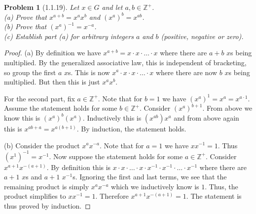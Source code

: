 \documentclass{article}
\newtheorem{problem}{Problem}
\begin{document}
\begin{problem}[1.1.19]
\label{powers}
Let $x \in G$ and let $a, b \in \mathbb{Z}^+$.\\
(a) Prove that $x^{a+b} = x^ax^b$ and $(x^a)^b = x^{ab}$.\\
(b) Prove that $(x^a)^{-1} = x^{-a}$.\\
(c) Establish part (a) for arbitrary integers $a$ and $b$ (positive, negative or zero).
\end{problem}
\begin{proof}
(a) By definition we have $x^{a+b} = x \cdot x \cdot \dots \cdot x$ where there are $a + b$ $x$s being multiplied. By the generalized associative law, this is independent of bracketing, so group the first $a$ $x$s. This is now $x^a \cdot x \cdot x \cdot \dots \cdot x$ where there are now $b$ $x$s being multiplied. But then this is just $x^ax^b$.

For the second part, fix $a \in \mathbb{Z}^+$. Note that for $b = 1$ we have $(x^a)^1 = x^a = x^{a \cdot 1}$. Assume the statement holds for some $b \in \mathbb{Z}^+$. Consider $(x^a)^{b+1}$. From above we know this is $(x^a)^b(x^a)$. Inductively this is $(x^{ab})x^a$ and from above again this is $x^{ab+a} = x^{a(b+1)}$. By induction, the statement holds.

(b) Consider the product $x^a x^{-a}$. Note that for $a = 1$ we have $xx^{-1} = 1$. Thus $(x^1)^{-1} = x^{-1}$. Now suppose the statement holds for some $a \in \mathbb{Z}^+$. Consider $x^{a+1}x^{-(a+1)}$. By definition this is $x \cdot x \cdot \dots \cdot x \cdot x^{-1} \cdot x^{-1} \cdot \dots \cdot x^{-1}$ where there are $a+1$ $x$s and $a+1$ $x^{-1}$s. Ignoring the first and last terms, we see that the remaining product is simply $x^ax^{-a}$ which we inductively know is $1$. Thus, the product simplifies to $xx^{-1} = 1$. Therefore $x^{a+1}x^{-(a+1)} = 1$. The statement is thus proved by induction.


\end{proof}
\end{document}
